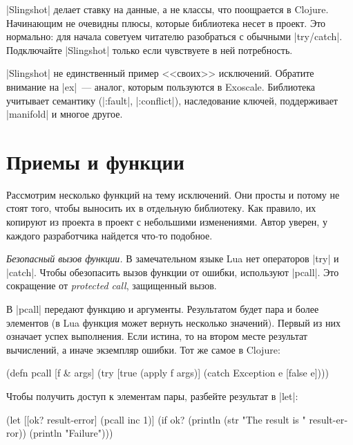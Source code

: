 \spverb|Slingshot| делает ставку на данные, а не классы, что поощрается в
Clojure. Начинающим не очевидны плюсы, которые библиотека несет в проект. Это
нормально: для начала советуем читателю разобраться с обычными
\spverb|try/catch|. Подключайте \spverb|Slingshot| только если чувствуете в ней
потребность.

\spverb|Slingshot| не единственный пример <<своих>> исключений. Обратите
внимание на \spverb|ex|~--- аналог, которым
пользуются в Exoscale. Библиотека учитывает семантику (\spverb|:fault|,
\spverb|:conflict|), наследование ключей, поддерживает \spverb|manifold| и
многое другое.

\section{Приемы и функции}

Рассмотрим несколько функций на тему исключений. Они просты и потому не стоят
того, чтобы выносить их в отдельную библиотеку. Как правило, их копируют из
проекта в проект с небольшими изменениями. Автор уверен, у каждого разработчика
найдется что-то подобное.

\emph{Безопасный вызов функции.} В замечательном языке Lua нет операторов
\spverb|try| и \spverb|catch|. Чтобы обезопасить вызов функции от ошибки,
используют \spverb|pcall|. Это
сокращение от \emph{protected call}, защищенный вызов.

В \spverb|pcall| передают функцию и аргументы. Результатом будет пара и более
элементов (в Lua функция может вернуть несколько значений). Первый из них
означает успех выполнения. Если истина, то на втором месте результат вычислений,
а иначе экземпляр ошибки. Тот же самое в Clojure:

\begin{english}
  \begin{clojure}
(defn pcall [f & args]
  (try
    [true (apply f args)]
    (catch Exception e [false e])))
  \end{clojure}
\end{english}

Чтобы получить доступ к элементам пары, разбейте результат в \spverb|let|:

\begin{english}
  \begin{clojure}
(let [[ok? result-error] (pcall inc 1)]
  (if ok?
    (println (str "The result is " result-error))
    (println "Failure")))
  \end{clojure}
\end{english}

